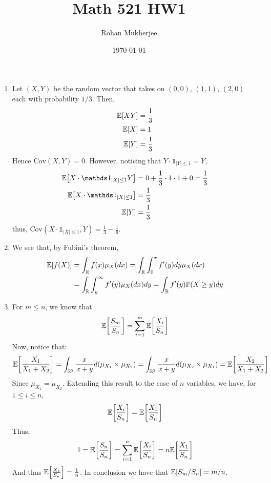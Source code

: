 \documentclass[12pt]{article}
\title{Math 521 HW1}
\date{\today}
\author{Rohan Mukherjee}
\theoremstyle{definitionstyle}
\def\mbb#1{\mathbb{#1}}
\def\R{\mbb{R}}
\newcommand{\1}{\mathds 1}
\renewcommand{\P}{\mathbb P \qty}
\newcommand{\E}{\mathbb E \qty}
\begin{document}
    \maketitle
    \begin{enumerate}
        \item Let $(X,Y)$ be the random vector that takes on $(0,0)$, $(1, 1)$, $(2, 0)$ each with probability $1/3$. Then,
        \begin{align*}
            \E[XY] &= \frac 13 \\
            \E[X] &= 1 \\
            \E[Y] &= \frac 13 \\
        \end{align*}
        Hence $\mathrm{Cov}(X,Y) = 0$. However, noticing that $Y \cdot \1_{|Y| \leq 1} = Y$,
        \begin{align*}
            \E[X \cdot \1_{|X| \leq 1} Y] &= 0 + \frac 13 \cdot 1 \cdot 1 + 0 = \frac 13 \\
            \E[X \cdot \1_{|X| \leq 1}] &= \frac 13 \\
            \E[Y] &= \frac 13
        \end{align*}
        thus, $\mathrm{Cov}(X \cdot \1_{|X| \leq 1}, Y) = \frac 13 - \frac 19$.

        \item We see that, by Fubini's theorem,
        \begin{align*}
            \E[f(X)] &= \int_\R f(x) \mu_X(dx) = \int_\R \int_0^x f'(y)dy \mu_X(dx) \\ &= \int_\R \int_y^\infty f'(y)\mu_X(dx)dy = \int_\R f'(y) \P(X \geq y)dy
        \end{align*}

        \item For $m \leq n$, we know that
        \begin{align*}
            \E[\frac{S_m}{S_n}] = \sum_{i=1}^m \E[\frac{X_i}{S_n}]
        \end{align*}
        Now, notice that:
        \begin{align*}
            \E[\frac{X_1}{X_1+X_2}] = \int_{\R^2} \frac{x}{x+y} d(\mu_{X_1} \times \mu_{X_2}) = \int_{\R^2} \frac{x}{x+y} d(\mu_{X_2} \times \mu_{X_1}) = \E[\frac{X_2}{X_1+X_2}]
        \end{align*}
        Since $\mu_{X_1} = \mu_{X_2}$. Extending this result to the case of $n$ variables, we have, for $1 \leq i \leq n$,
        \begin{align*}
            \E[\frac{X_i}{S_n}] = \E[\frac{X_1}{S_n}]
        \end{align*}
        Thus,
        \begin{align*}
            1 = \E[\frac{S_n}{S_n}] = \sum_{i=1}^n \E[\frac{X_i}{S_n}] = n \E[\frac{X_1}{S_n}]
        \end{align*}
        And thus $\E[\frac{X_1}{S_n}] = \frac 1n$. In conclusion we have that $\E[S_m/S_n] = m/n$.


\end{enumerate}
\end{document}
